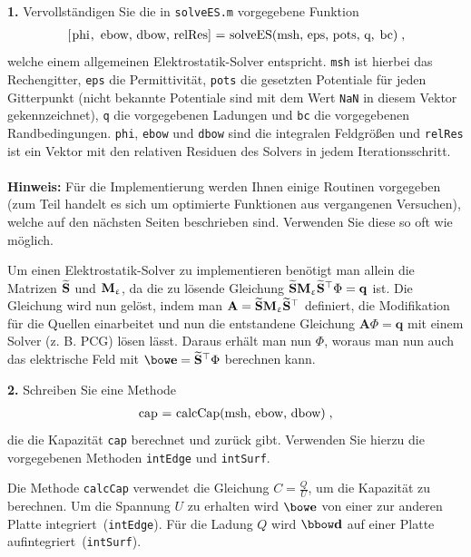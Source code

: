 \documentclass[Protokollheft.tex]{subfiles}
\begin{document}
\begin{framed}
	\noindent \textbf{1.} Vervollständigen Sie die in \lstinline{solveES.m} vorgegebene Funktion
\begin{align}
\lstinline{[phi, ebow, dbow, relRes] = solveES(msh, eps, pots, q, bc)} \; ,
\end{align}
welche einem allgemeinen Elektrostatik-Solver entspricht. \lstinline{msh} ist hierbei das Rechengitter, \lstinline{eps} die Permittivität, \lstinline{pots} die gesetzten Potentiale für jeden Gitterpunkt (nicht bekannte Potentiale sind mit dem Wert \lstinline{NaN} in diesem Vektor gekennzeichnet), \lstinline{q} die vorgegebenen Ladungen und \lstinline{bc} die vorgegebenen Randbedingungen. \lstinline{phi}, \lstinline{ebow} und \lstinline{dbow} sind die integralen Feldgrößen und \lstinline{relRes} ist ein Vektor mit den relativen Residuen des Solvers in jedem Iterationsschritt.\\
\ \\
{\textbf{Hinweis:}} Für die Implementierung werden Ihnen einige Routinen vorgegeben
(zum Teil handelt es sich um optimierte Funktionen aus vergangenen Versuchen), welche auf den nächsten Seiten beschrieben sind. Verwenden Sie diese so oft wie möglich.\label{exer:solveES}
\end{framed}
\noindent
Um einen Elektrostatik-Solver zu implementieren benötigt man allein die Matrizen $\widetilde{\mathbf{S}}$ und $\mathbf{M}_{\upvarepsilon}$, da die zu lösende Gleichung $\widetilde{\mathbf{S}}\mathbf{M}_{\upvarepsilon}\widetilde{\mathbf{S}}^\top\Phi=\mathbf{q}$ ist. Die Gleichung wird nun gelöst, indem man $\mathbf{A}=\widetilde{\mathbf{S}}\mathbf{M}_{\upvarepsilon}\widetilde{\mathbf{S}}^\top$ definiert, die Modifikation für die Quellen einarbeitet und nun die entstandene Gleichung $\mathbf{A}\Phi=\mathbf{q}$ mit einem Solver (z. B. PCG) lösen lässt. Daraus erhält man nun $\Phi$, woraus man nun auch das elektrische Feld mit $\efit=\divdfit^\top\Phi$ berechnen kann.

\begin{framed}
	\noindent \textbf{2.} Schreiben Sie eine Methode
\begin{align}
\lstinline{cap = calcCap(msh, ebow, dbow)} \; ,
\end{align}
die die Kapazität \lstinline{cap} berechnet und zurück gibt. Verwenden Sie hierzu die vorgegebenen Methoden \lstinline{intEdge} und
\lstinline{intSurf}.\label{exer:calcCap}
\end{framed}
\noindent
Die Methode \lstinline{calcCap} verwendet die Gleichung $C=\frac{Q}{U}$, um die Kapazität zu berechnen. Um die Spannung $U$ zu erhalten wird $\efit$ von einer zur anderen Platte \glqq integriert\grqq\ (\lstinline{intEdge}). Für die Ladung $Q$ wird $\dfit$ auf einer Platte \glqq aufintegriert\grqq\ (\lstinline{intSurf}).
\end{document}
